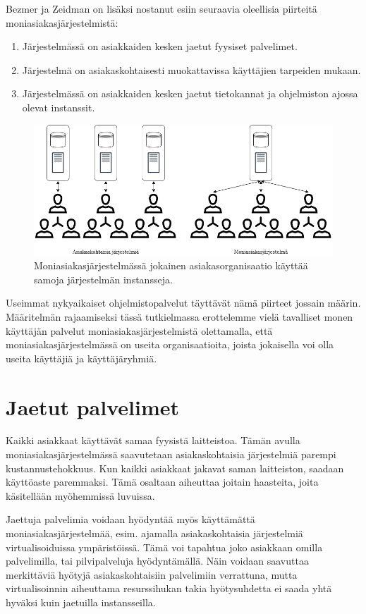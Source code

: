 Bezmer ja Zeidman on lisäksi nostanut esiin seuraavia oleellisia piirteitä moniasiakasjärjestelmistä:

\begin{enumerate}
  \item Järjestelmässä on asiakkaiden kesken jaetut fyysiset palvelimet.
  \item Järjestelmä on asiakaskohtaisesti muokattavissa käyttäjien tarpeiden mukaan.
  \item Järjestelmässä on asiakkaiden kesken jaetut tietokannat ja ohjelmiston ajossa olevat instanssit.
\end{enumerate}

\begin{figure}[h]
  \centering
  \includegraphics[width=16cm]{kuvat/yksi_vs_moni.png}
  \caption{Moniasiakasjärjestelmässä jokainen asiakasorganisaatio käyttää samoja järjestelmän instansseja.}
\end{figure}

Useimmat nykyaikaiset ohjelmistopalvelut täyttävät nämä piirteet jossain määrin. Määritelmän rajaamiseksi tässä tutkielmassa erottelemme vielä tavalliset monen käyttäjän palvelut moniasiakasjärjestelmistä olettamalla, että moniasiakasjärjestelmässä on useita organisaatioita, joista jokaisella voi olla useita käyttäjiä ja käyttäjäryhmiä.

\section{Jaetut palvelimet}
Kaikki asiakkaat käyttävät samaa fyysistä laitteistoa. Tämän avulla moniasiakasjärjestelmässä saavutetaan asiakaskohtaisia järjestelmiä parempi kustannustehokkuus. Kun kaikki asiakkaat jakavat saman laitteiston, saadaan käyttöaste paremmaksi. Tämä osaltaan aiheuttaa joitain haasteita, joita käsitellään myöhemmissä luvuissa.

Jaettuja palvelimia voidaan hyödyntää myös käyttämättä moniasiakasjärjestelmää, esim. ajamalla asiakaskohtaisia järjestelmiä virtualisoiduissa ympäristöissä. Tämä voi tapahtua joko asiakkaan omilla palvelimilla, tai pilvipalveluja hyödyntämällä. Näin voidaan saavuttaa merkittäviä hyötyjä asiakaskohtaisiin palvelimiin verrattuna, mutta virtualisoinnin aiheuttama resurssihukan takia hyötysuhdetta ei saada yhtä hyväksi kuin jaetuilla instansseilla.


